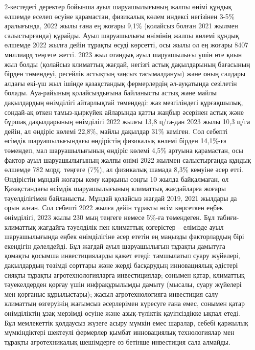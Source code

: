 {{2-кестедегі деректер бойынша ауыл шаруашылығының жалпы өнімі құндық
өлшемде еселеп өсуіне қарамастан, физикалық көлем индексі негізінен
3-5\% аралығында, 2022 жылы ғана ең жоғары 9,1\% (қолайсыз болған 2021
жылмен салыстырғанда) құрайды. Ауыл шаруашылығы өнімінің жалпы көлемі
құндық өлшемде 2022 жылға дейін тұрақты өсуді көрсетті, осы жылы ол ең
жоғары 8407 миллиард теңгеге жетті. 2023 жыл отандық ауыл шаруашылығы
үшін өте қиын жыл болды (қолайсыз климаттық жағдай, негізгі астық
дақылдарының бағасының бірден төмендеуі, ресейлік астықтың заңсыз
тасымалдануы) және оның салдары алдағы екі-үш жыл ішінде қазақстандық
фермерлердің әл-ауқатында сезілетін болады. Ауа-райының қолайсыздығына
байланысты астық және майлы дақылдардың өнімділігі айтарлықтай
төмендеді: жаз мезгіліндегі құрғақшылық, сондай-ақ өткен тамыз-қыркүйек
айларында қатты жаңбыр әсерінен астық және бұршақ дақылдарының
өнімділігі 2022 жылғы 13,8 ц/га-дан 2023 жылы 10,3 ц/га дейін, ал
өндіріс көлемі 22,8\%, майлы дақылдар 31\% кеміген. Cол себепті өсімдік
шаруашылығындағы өндірістің физикалық көлемі бірден 14,1\%-ға төмендеп,
мал шаруашылығының өндіріс көлемі 4,5\% артуына қарамастан, осы фактор
ауыл шаруашылығының жалпы өнімі 2022 жылмен салыстырғанда құндық өлшемде
782 млрд. теңгеге (7\%), ал физикалық шамада 8,3\% кемуіне әсер етті.
Өндірістің мұндай жоғары кему қарқыны соңғы 10 жылда байқалмаған, ол
Қазақстандағы өсімдік шаруашылығының климаттық жағдайларға жоғары
тәуелділігімен байланысты. Мұндай қолайсыз жағдай 2019, 2021 жылдары да
орын алған. Сол себепті 2022 жылға дейін тұрақты өсім көрсеткен еңбек
өнімділігі, 2023 жылы 230 мың теңгеге немесе 5\%-ға төмендеген. Бұл
табиғи-климаттық жағдайға тәуелділік пен климаттық өзгерістер --
елімізде ауыл шаруашылығында еңбек өнімділігіне әсер ететін ең маңызды
факторлардың бірі екендігін дәлелдейді. Бұл жағдай ауыл шаруашылығын
тұрақты дамытуға қомақты қосымша инвестицияларды қажет етеді: тамшылатып
суару жүйелері, дақылдардың төзімді сорттары және жерді басқарудың
инновациялық әдістері сияқты тұрақты агротехнологияларға инвестициялар;
сонымен қатар, климаттық тәуекелдерден қорғау үшін инфрақұрылымды дамыту
(мысалы, суару жүйелері мен қорғаныс құрылыстары); жасыл
агротехнологияға инвестиция салу климаттың өзгеруінің жағымсыз
әсерлерімен күресуге ғана емес, сонымен қатар өнімділіктің ұзақ мерзімді
өсуіне және азық-түліктік қауіпсіздікке ықпал етеді. Бұл мемлекеттік
қолдаусыз жүзеге асыру мүмкін емес шаралар, себебі қаржылық
мүмкіндіктері шектеулі фермерлер қымбат инновациялық технологиялар мен
тұрақты агротехникалық шешімдерге өз бетінше инвестиция сала алмайды.

}}
